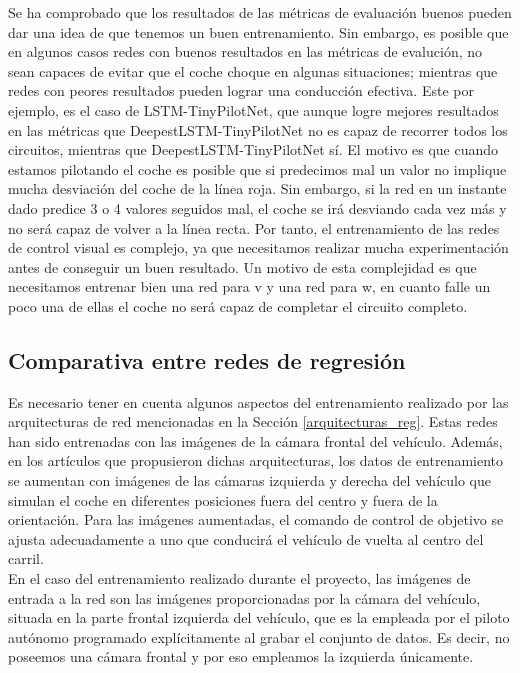 Se ha comprobado que los resultados de las métricas de evaluación buenos pueden dar una idea de que tenemos un buen entrenamiento. Sin embargo, es posible que en algunos casos redes con buenos resultados en las métricas de evalución, no sean capaces de evitar que el coche choque en algunas situaciones; mientras que redes con peores resultados pueden lograr una conducción efectiva. Este por ejemplo, es el caso de LSTM-TinyPilotNet, que aunque logre mejores resultados en las métricas que DeepestLSTM-TinyPilotNet no es capaz de recorrer todos los circuitos, mientras que DeepestLSTM-TinyPilotNet sí. El motivo es que cuando estamos pilotando el coche es posible que si predecimos mal un valor no implique mucha desviación del coche de la línea roja. Sin embargo, si la red en un instante dado predice 3 o 4 valores seguidos mal, el coche se irá desviando cada vez más y no será capaz de volver a la línea recta. Por tanto, el entrenamiento de las redes de control visual es complejo, ya que necesitamos realizar mucha experimentación antes de conseguir un buen resultado. Un motivo de esta complejidad es que necesitamos entrenar bien una red para v y una red para w, en cuanto falle un poco una de ellas el coche no será capaz de completar el circuito completo.\\




\subsection{Comparativa entre redes de regresión}\label{comparativa}

Es necesario tener en cuenta algunos aspectos del entrenamiento realizado por las arquitecturas de red mencionadas en la Sección \ref{arquitecturas_reg}. Estas redes han sido entrenadas con las imágenes de la cámara frontal del vehículo. Además, en los artículos que propusieron dichas arquitecturas, los datos de entrenamiento se aumentan con imágenes de las cámaras izquierda y derecha del vehículo que simulan el coche en diferentes posiciones fuera del centro y fuera de la orientación. Para las imágenes aumentadas, el comando de control de objetivo se ajusta adecuadamente a uno que conducirá el vehículo de vuelta al centro del carril.\\

En el caso del entrenamiento realizado durante el proyecto, las imágenes de entrada a la red son las imágenes proporcionadas por la cámara del vehículo, situada en la parte frontal izquierda del vehículo, que es la empleada por el piloto autónomo programado explícitamente al grabar el conjunto de datos. Es decir, no poseemos una cámara frontal y por eso empleamos la izquierda únicamente.\\ 

